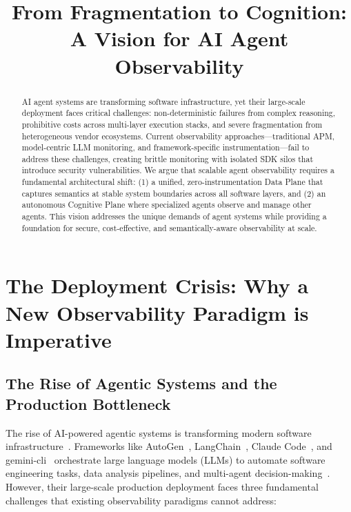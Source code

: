 \documentclass[sigplan,screen,review,9pt]{acmart}
\begin{document}
\title{From Fragmentation to Cognition: A Vision for AI Agent Observability}


\author{}


\sloppy
\begin{abstract}
AI agent systems are transforming software infrastructure, yet their large-scale deployment faces critical challenges: non-deterministic failures from complex reasoning, prohibitive costs across multi-layer execution stacks, and severe fragmentation from heterogeneous vendor ecosystems. Current observability approaches—traditional APM, model-centric LLM monitoring, and framework-specific instrumentation—fail to address these challenges, creating brittle monitoring with isolated SDK silos that introduce security vulnerabilities. We argue that scalable agent observability requires a fundamental architectural shift: (1) a unified, zero-instrumentation Data Plane that captures semantics at stable system boundaries across all software layers, and (2) an autonomous Cognitive Plane where specialized agents observe and manage other agents. This vision addresses the unique demands of agent systems while providing a foundation for secure, cost-effective, and semantically-aware observability at scale.
\end{abstract}


\maketitle



\section{The Deployment Crisis: Why a New Observability Paradigm is Imperative}

\subsection{The Rise of Agentic Systems and the Production Bottleneck}

The rise of AI-powered agentic systems is transforming modern software infrastructure~\cite{wang2024survey,guo2024survey}. Frameworks like AutoGen~\cite{autogen}, LangChain~\cite{langchain}, Claude Code~\cite{claudecode}, and gemini-cli~\cite{geminicli} orchestrate large language models (LLMs) to automate software engineering tasks, data analysis pipelines, and multi-agent decision-making~\cite{tran2025survey}. However, their large-scale production deployment faces three fundamental challenges that existing observability paradigms cannot address:
\end{document}
